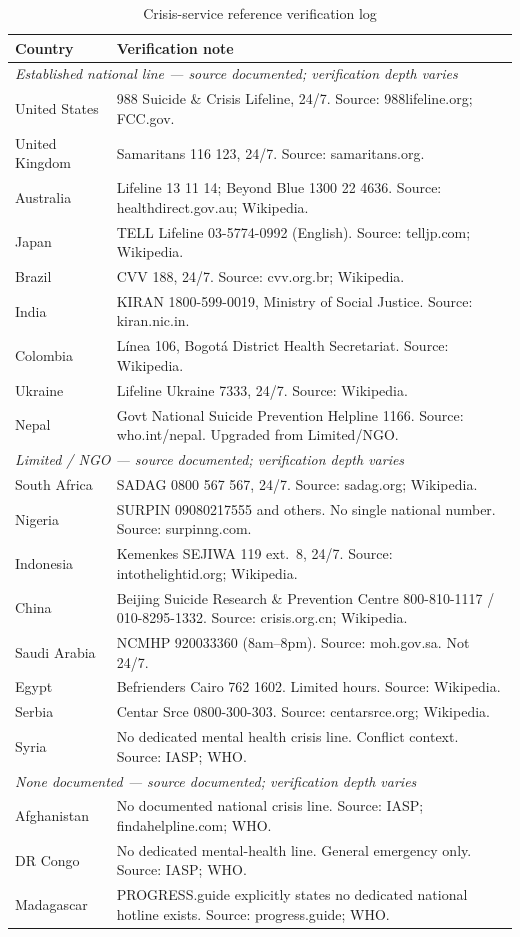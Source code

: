 \begin{table}[H]
\centering
\caption{Crisis-service reference verification log}
\label{tab:refverify}
\begin{tabular}{lp{9cm}}
\toprule
Country & Verification note \\
\midrule
\multicolumn{2}{l}{\textit{Established national line — source documented; verification depth varies}} \\
United States & 988 Suicide \& Crisis Lifeline, 24/7. Source: 988lifeline.org; FCC.gov. \\
United Kingdom & Samaritans 116 123, 24/7. Source: samaritans.org. \\
Australia & Lifeline 13 11 14; Beyond Blue 1300 22 4636. Source: healthdirect.gov.au; Wikipedia. \\
Japan & TELL Lifeline 03-5774-0992 (English). Source: telljp.com; Wikipedia. \\
Brazil & CVV 188, 24/7. Source: cvv.org.br; Wikipedia. \\
India & KIRAN 1800-599-0019, Ministry of Social Justice. Source: kiran.nic.in. \\
Colombia & Línea 106, Bogotá District Health Secretariat. Source: Wikipedia. \\
Ukraine & Lifeline Ukraine 7333, 24/7. Source: Wikipedia. \\
Nepal & Govt National Suicide Prevention Helpline 1166. Source: who.int/nepal. Upgraded from Limited/NGO. \\
\midrule
\multicolumn{2}{l}{\textit{Limited / NGO — source documented; verification depth varies}} \\
South Africa & SADAG 0800 567 567, 24/7. Source: sadag.org; Wikipedia. \\
Nigeria & SURPIN 09080217555 and others. No single national number. Source: surpinng.com. \\
Indonesia & Kemenkes SEJIWA 119 ext.~8, 24/7. Source: intothelightid.org; Wikipedia. \\
China & Beijing Suicide Research \& Prevention Centre 800-810-1117 / 010-8295-1332. Source: crisis.org.cn; Wikipedia. \\
Saudi Arabia & NCMHP 920033360 (8am--8pm). Source: moh.gov.sa. Not 24/7. \\
Egypt & Befrienders Cairo 762 1602. Limited hours. Source: Wikipedia. \\
Serbia & Centar Srce 0800-300-303. Source: centarsrce.org; Wikipedia. \\
Syria & No dedicated mental health crisis line. Conflict context. Source: IASP; WHO. \\
\midrule
\multicolumn{2}{l}{\textit{None documented — source documented; verification depth varies}} \\
Afghanistan & No documented national crisis line. Source: IASP; findahelpline.com; WHO. \\
DR Congo & No dedicated mental-health line. General emergency only. Source: IASP; WHO. \\
Madagascar & PROGRESS.guide explicitly states no dedicated national hotline exists. Source: progress.guide; WHO. \\
\bottomrule
\end{tabular}
\end{table}

